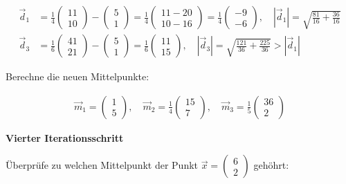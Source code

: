 \documentclass[11pt]{article}
\begin{document}
\[\begin{aligned}
\vec{d}_1 &= \frac{1}{4}\begin{pmatrix} 11 \\ 10 \end{pmatrix} -  \begin{pmatrix} 5 \\ 1 \end{pmatrix} =  \frac{1}{4} \begin{pmatrix} 11 - 20 \\ 10 - 16  \end{pmatrix} = \frac{1}{4}\begin{pmatrix} -9 \\ -6 \end{pmatrix}, \quad \left| \vec{d}_1 \right| = \sqrt{\frac{81}{16} + \frac{36}{16}}  \\
\vec{d}_3 &= \frac{1}{6}\begin{pmatrix} 41 \\ 21 \end{pmatrix} -  \begin{pmatrix} 5 \\ 1 \end{pmatrix} =  \frac{1}{6}\begin{pmatrix} 11 \\ 15 \end{pmatrix}, \quad \left| \vec{d}_3 \right| = \sqrt{\frac{121}{36} + \frac{225}{36}} > \left| \vec{d}_1 \right|
\end{aligned}\]

Berechne die neuen Mittelpunkte:

\[ \begin{aligned}
\vec{m}_1 =  \begin{pmatrix} 1 \\ 5 \end{pmatrix}, \quad 
\vec{m}_2 = \frac{1}{4} \begin{pmatrix} 15 \\ 7 \end{pmatrix}, \quad 
\vec{m}_3 = \frac{1}{5} \begin{pmatrix} 36 \\ 2 \end{pmatrix} 
\end{aligned} \]

\textbf{Vierter Iterationsschritt}

Überprüfe zu welchen Mittelpunkt der Punkt
\(\vec{x} = \begin{pmatrix} 6 \\ 2 \end{pmatrix}\) gehöhrt:
\end{document}
